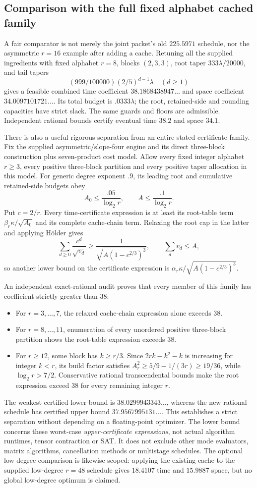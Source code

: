 \subsection{Comparison with the full fixed alphabet cached family}
A fair comparator is not merely the joint packet's old $225.5971$ schedule, nor the asymmetric $r=16$ example after adding a cache. Retuning all the supplied ingredients with fixed alphabet $r=8$, blocks $(2,3,3)$, root taper $333\lambda/20000$, and tail tapers
\[
 (999/100000)(2/5)^{d-1}\lambda\quad(d\ge1)
\]
gives a feasible combined time coefficient $38.1868438947\ldots$ and space coefficient $34.0097101721\ldots$. Its total budget is $.0333\lambda$; the root, retained-side and rounding capacities have strict slack. The same guards and floors are admissible. Independent rational bounds certify eventual time $38.2$ and space $34.1$.

There is also a useful rigorous separation from an entire stated certificate family. Fix the supplied asymmetric/slope-four engine and its direct three-block construction plus seven-product cost model. Allow every fixed integer alphabet $r\ge3$, every positive three-block partition and every positive taper allocation in this model. For generic degree exponent $.9$, its leading root and cumulative retained-side budgets obey
\[
 A_0\le\frac{.05}{\log_2r},\qquad A\le\frac{.1}{\log_2r}.
\]
Put $c=2/r$. Every time-certificate expression is at least its root-table term $\beta_r\kappa/\sqrt{A_0}$ and its complete cache-chain term. Relaxing the root cap in the latter and applying H\"older gives
\[
 \sum_{d\ge0}\frac{c^d}{\sqrt{v_d}}
 \ge\frac1{\sqrt{A(1-c^{2/3})^3}},\qquad \sum_dv_d\le A,
\]
so another lower bound on the certificate expression is
$\alpha_r\kappa/\sqrt{A(1-c^{2/3})^3}$.

An independent exact-rational audit proves that every member of this family has coefficient strictly greater than $38$:
\begin{itemize}
\item For $r=3,\ldots,7$, the relaxed cache-chain expression alone exceeds $38$.
\item For $r=8,\ldots,11$, enumeration of every unordered positive three-block partition shows the root-table expression exceeds $38$.
\item For $r\ge12$, some block has $k\ge r/3$. Since $2rk-k^2-k$ is increasing for integer $k<r$, its build factor satisfies $A_r^2\ge5/9-1/(3r)\ge19/36$, while $\log_2r>7/2$. Conservative rational transcendental bounds make the root expression exceed $38$ for every remaining integer $r$.
\end{itemize}
The weakest certified lower bound is $38.0299943343\ldots$, whereas the new rational schedule has certified upper bound $37.9567995131\ldots$. This establishes a strict separation without depending on a floating-point optimizer. The lower bound concerns these worst-case \emph{upper-certificate expressions}, not actual algorithm runtimes, tensor contraction or SAT. It does not exclude other mode evaluators, matrix algorithms, cancellation methods or multistage schedules. The optional low-degree comparison is likewise scoped: applying the existing cache to the supplied low-degree $r=48$ schedule gives $18.4107$ time and $15.9887$ space, but no global low-degree optimum is claimed.
